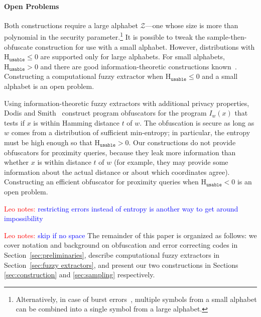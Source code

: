 \documentclass[11pt]{article}
\newcommand{\secref}[1]{\mbox{Section~\ref{#1}}}
\newcommand{\Huse}{\mathrm{H}_{\mathtt{usable}}}
\newcommand{\authnote}[2]{{\textcolor{red}{\textsf{#1 notes: }\textcolor{blue}{ #2}}\marginpar{\textcolor{red}{\textbf{!!!!!}}}}}
\newcommand{\authnote}[2]{}
\newcommand{\lnote}[1]{{\authnote{Leo}{#1}}}
\begin{document}
\paragraph{Open Problems}
Both constructions require a large alphabet $\mathcal{Z}$---one whose size is more than polynomial in the security parameter.\footnote{Alternatively, in case of burst errors~\cite{gilbert1960capacity}, multiple symbols from a small alphabet can be combined into a single symbol from a large alphabet.}  It is possible to tweak the sample-then-obfuscate construction for use with a small alphabet.  However, distributions with $\Huse \le 0$ are supported only for large alphabets.  For small alphabets, $\Huse>0$ and there are good information-theoretic constructions known~\cite[Section 5]{DBLP:journals/siamcomp/DodisORS08}.
Constructing a computational fuzzy extractor when $\Huse\le 0$ and a small alphabet is an open problem.

Using information-theoretic fuzzy extractors with additional privacy properties, Dodis and Smith~\cite[Section 5]{DBLP:conf/stoc/DodisS05} construct program obfuscators for the program $I_w(x)$ that tests if $x$ is within Hamming distance $t$ of $w$. The obfuscation is secure as long as $w$ comes from a distribution of sufficient min-entropy; in particular, the entropy must be high enough so that $\Huse>0$. Our constructions do not provide obfuscators for proximity queries, because they leak more information than whether $x$ is within distance $t$ of $w$ (for example, they may provide some information about the actual distance or about which coordinates agree). Constructing an efficient obfuscator for proximity queries when $\Huse<0$ is an open problem.

\lnote{restricting errors instead of entropy is another way to get around impossibility}

\medskip
\lnote{skip if no space}
The remainder of this paper is organized as follows: we cover notation and background on obfuscation and error correcting codes in \secref{sec:preliminaries}, describe computational fuzzy extractors in \secref{sec:fuzzy extractors}, and present our two constructions in Sections \ref{sec:construction} and \ref{sec:sampling} respectively.
\end{document}

